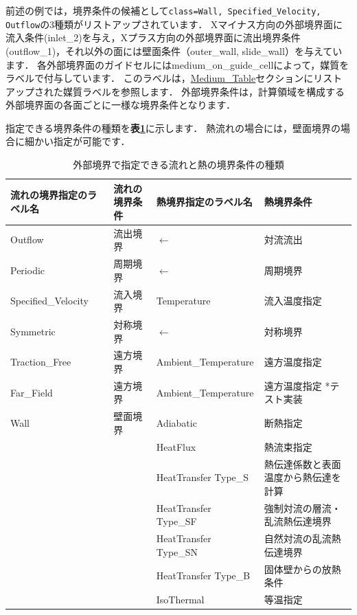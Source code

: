 前述の例では，境界条件の候補として\verb|class=Wall, Specified_Velocity, Outflow|の3種類がリストアップされています．
Xマイナス方向の外部境界面に流入条件(inlet\_2)を与え，Xプラス方向の外部境界面に流出境界条件(outflow\_1)，それ以外の面には壁面条件（outer\_wall, slide\_wall）を与えています．
各外部境界面のガイドセルにはmedium\_on\_guide\_cellによって，媒質をラベルで付与しています．
このラベルは，\hyperlink{tgt:medium_table}{Medium\_Table}セクションにリストアップされた媒質ラベルを参照します．
外部境界条件は，計算領域を構成する外部境界面の各面ごとに一様な境界条件となります．

指定できる境界条件の種類を\textbf{表\ref{tbl:outer BC physical}}に示します．
熱流れの場合には，壁面境界の場合に細かい指定が可能です．

\begin{table}[htdp]
\caption{外部境界で指定できる流れと熱の境界条件の種類}
\begin{center}
\small
\begin{tabular}{ll|ll} \toprule
流れの境界指定のラベル名 &  流れの境界条件 & 熱境界指定のラベル名 & 熱境界条件\\ \midrule
Outflow & 流出境界 & $\leftarrow$ & 対流流出\\
Periodic & 周期境界 & $\leftarrow$ & 周期境界\\
Specified\_Velocity & 流入境界 & Temperature & 流入温度指定\\
Symmetric & 対称境界 & $\leftarrow$ & 対称境界\\
Traction\_Free & 遠方境界 & Ambient\_Temperature & 遠方温度指定\\
Far\_Field & 遠方境界 & Ambient\_Temperature & 遠方温度指定 *テスト実装\\ \hline
Wall & 壁面境界 & Adiabatic & 断熱指定\\
& & HeatFlux & 熱流束指定\\ 
& & HeatTransfer Type\_S & 熱伝達係数と表面温度から熱伝達を計算\\
& & HeatTransfer Type\_SF & 強制対流の層流・乱流熱伝達境界\\
& & HeatTransfer Type\_SN & 自然対流の乱流熱伝達境界\\
& & HeatTransfer Type\_B & 固体壁からの放熱条件\\
& & IsoThermal & 等温指定\\
\bottomrule
\end{tabular}
\end{center}
\label{tbl:outer BC physical}
\end{table}


